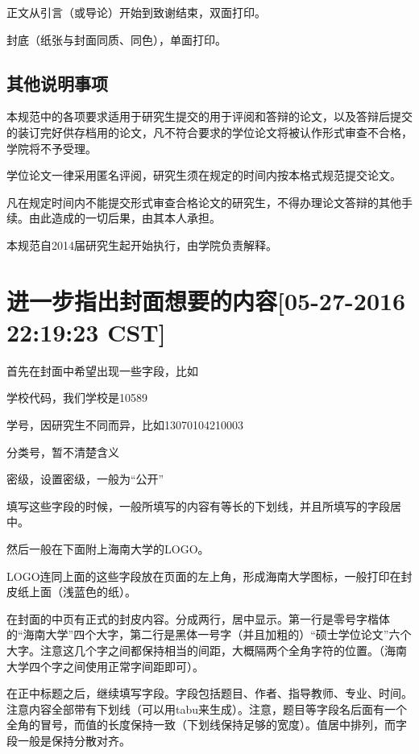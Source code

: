 \documentclass{hnuthesis}%
\begin{document}
正文从引言（或导论）开始到致谢结束，双面打印。

封底（纸张与封面同质、同色），单面打印。


\subsection{其他说明事项}

\begin{asparaenum}
\item 本规范中的各项要求适用于研究生提交的用于评阅和答辩的论文，以及答辩后提交的装订完好供存档用的论文，凡不符合要求的学位论文将被认作形式审查不合格，学院将不予受理。
\item 学位论文一律采用匿名评阅，研究生须在规定的时间内按本格式规范提交论文。
\item 凡在规定时间内不能提交形式审查合格论文的研究生，不得办理论文答辩的其他手续。由此造成的一切后果，由其本人承担。
\item 本规范自2014届研究生起开始执行，由学院负责解释。
\end{asparaenum}



\section{进一步指出封面想要的内容[05-27-2016 22:19:23 CST]}


首先在封面中希望出现一些字段，比如

\begin{asparaenum}
\item 学校代码，我们学校是10589
\item 学号，因研究生不同而异，比如13070104210003
\item 分类号，暂不清楚含义
\item 密级，设置密级，一般为“公开”
\end{asparaenum}

填写这些字段的时候，一般所填写的内容有等长的下划线，并且所填写的字段居中。

然后一般在下面附上海南大学的LOGO。

LOGO连同上面的这些字段放在页面的左上角，形成海南大学图标，一般打印在封皮纸上面（浅蓝色的纸）。

在封面的中页有正式的封皮内容。分成两行，居中显示。第一行是零号字楷体的“海南大学”四个大字，第二行是黑体一号字（并且加粗的）“硕士学位论文”六个大字。注意这几个字之间都保持相当的间距，大概隔两个全角字符的位置。（海南大学四个字之间使用正常字间距即可）。

在正中标题之后，继续填写字段。字段包括题目、作者、指导教师、专业、时间。注意内容全部带有下划线（可以用tabu来生成）。注意，题目等字段名后面有一个全角的冒号，而值的长度保持一致（下划线保持足够的宽度）。值居中排列，而字段一般是保持分散对齐。
\end{document}
